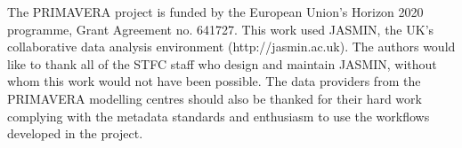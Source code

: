 \documentclass[gmd, manuscript]{copernicus}
\begin{document}

\begin{acknowledgements}
The PRIMAVERA project is funded by the European Union's Horizon 2020 programme, Grant Agreement no. 641727. This work used JASMIN, the UK's collaborative data analysis environment (http://jasmin.ac.uk). The authors would like to thank all of the STFC staff who design and maintain JASMIN, without whom this work would not have been possible. The data providers from the PRIMAVERA modelling centres should also be thanked for their hard work complying with the metadata standards and enthusiasm to use the workflows developed in the project.
\end{acknowledgements}






%
%
%











\end{document}
